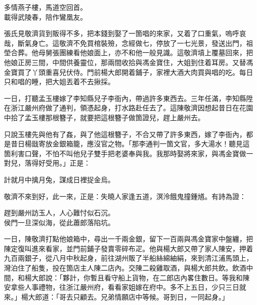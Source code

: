 \begin{myquote}
多情燕子樓，馬道空回首。\\載得武陵春，陪作鸞凰友。
\end{myquote}

張氏見敬濟貨到販得不多，把本錢到娶了一箇唱的來家，又着了口重氣，嗚呼哀哉，斷氣身亡。{}這敬濟不免買棺裝殮，念經做七，停放了一七光景，發送出門，祖塋合葬。他母舅張團練看他娘面上，亦不和他一般見識。{}這敬濟墳上覆墓回來，把他娘正房三間，中間供養靈位，那兩間收拾與馮金寶住，大姐到住着耳房。又替馮金寶買了丫頭重喜兒伏侍。門前楊大郎開着鋪子，家裡大酒大肉買與唱的吃。每日只和唱的睡，把大姐丟着不去揪採。

一日，打聽孟玉樓嫁了李知縣兒子李衙內，帶過許多東西去。三年任滿，李知縣陞在浙江嚴州府做了通判，領憑起身，打水路赴任去了。這陳敬濟因想起昔日在花園中拾了孟玉樓那根簪子，就要把這根簪子做箇證兒，趕上嚴州去。

只說玉樓先與他有了姦，與了他這根簪子，不合又帶了許多東西，嫁了李衙內，都是昔日楊戩寄放金銀箱籠，應沒官之物。{}「那李通判一箇文官，多大湯水！聽見這箇利害口聲，不怕不叫他兒子雙手把老婆奉與我。我那時娶將來家，與馮金寶做一對兒，落得好受用。」正是：

\begin{myquote}
計就月中擒月兔，謀成日裡捉金烏。
\end{myquote}

敬濟不來到好，此一來，正是：失曉人家逢五道，溟泠餓鬼撞鍾馗。有詩為證：

\begin{myquote}
趕到嚴州訪玉人，人心難忖似石沉。\\侯門一旦深似海，從此蕭郎落陷坑。
\end{myquote}

一日，陳敬濟打點他娘箱中，尋出一千兩金銀，留下一百兩與馮金寶家中盤纏，把陳定復叫進來看家，並門前鋪子發賣零碎布疋。他與楊大郎又帶了家人陳安，押着九百兩銀子，從八月中秋起身，前往湖州販了半船絲綿紬絹，來到清江浦馬頭上，灣泊住了船隻，投在箇店主人陳二店內。交陳二殺雞取酒，與楊大郎共飲。飲酒中間，和楊大郎說：「夥計，你暫且看守船上貨物，{}在二郎店內畧住數日。等我和陳安拿些人事禮物，往浙江嚴州府，看看家姐嫁在府中。多不上五日，少只三日就來。」楊大郎道：「哥去只顧去。兄弟情願店中等候。哥到日，一同起身。」

